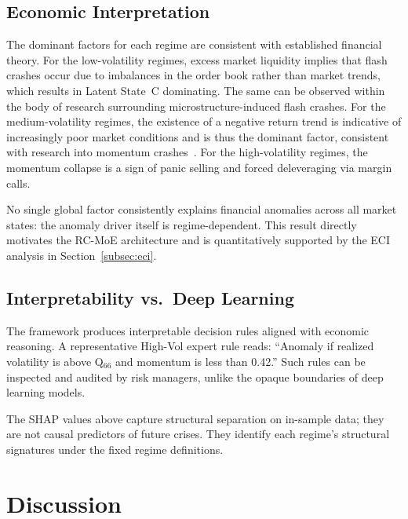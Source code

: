 \documentclass[]{interact}
\begin{document}
\subsection{Economic Interpretation}
The dominant factors for each regime are consistent with established financial theory. For the low-volatility regimes, excess market liquidity implies that flash crashes occur due to imbalances in the order book rather than market trends, which results in Latent State~C dominating. The same can be observed within the body of research surrounding microstructure-induced flash crashes. For the medium-volatility regimes, the existence of a negative return trend is indicative of increasingly poor market conditions and is thus the dominant factor, consistent with research into momentum crashes~\citep{daniel2016momentum}. For the high-volatility regimes, the momentum collapse is a sign of panic selling and forced deleveraging via margin calls.

No single global factor consistently explains financial anomalies across all market states: the anomaly driver itself is regime-dependent. This result directly motivates the RC-MoE architecture and is quantitatively supported by the ECI analysis in Section~\ref{subsec:eci}.

\subsection{Interpretability vs.\ Deep Learning}
The framework produces interpretable decision rules aligned with economic reasoning. A representative High-Vol expert rule reads: ``Anomaly if realized volatility is above Q$_{66}$ and momentum is less than 0.42.'' Such rules can be inspected and audited by risk managers, unlike the opaque boundaries of deep learning models.

The SHAP values above capture structural separation on in-sample data; they are not causal predictors of future crises. They identify each regime's structural signatures under the fixed regime definitions.

\section{Discussion}
\label{sec:discussion}

\end{document}
